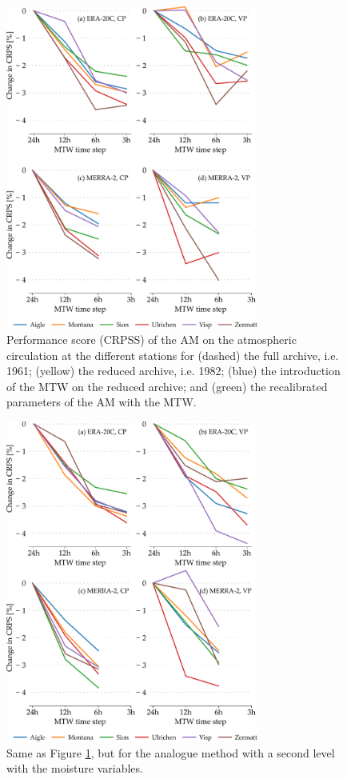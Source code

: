 \documentclass[hess, manuscript]{copernicus}
\begin{document}
	\begin{figure}[htb]
		\includegraphics[width=8.3cm]{fig03.pdf}
		\caption{Performance score (CRPSS) of the AM on the atmospheric circulation at the different stations for (dashed) the full archive, i.e. 1961; (yellow) the reduced archive, i.e. 1982; (blue) the introduction of the MTW on the reduced archive; and (green) the recalibrated parameters of the AM with the MTW.}
		\label{fig:plots_CRPSS_2Z}
	\end{figure}
	
	\begin{figure}[htb]
		\includegraphics[width=8.3cm]{fig04.pdf}
		\caption{Same as Figure \ref{fig:plots_CRPSS_2Z}, but for the analogue method with a second level with the moisture variables.}
		\label{fig:plots_CRPSS_2Z-2MI}
	\end{figure}
	
\end{document}
